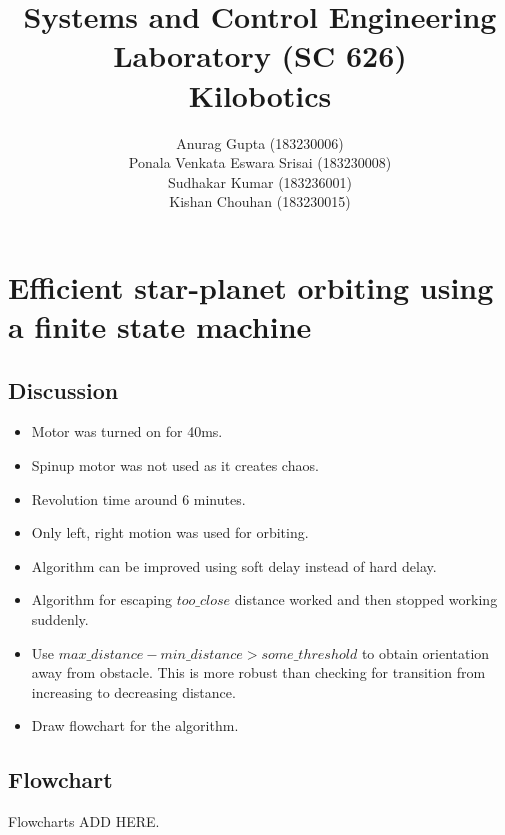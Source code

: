 \documentclass{report}[12pt]
\author{Anurag Gupta (183230006) \\ Ponala Venkata Eswara Srisai
(183230008)\\ Sudhakar Kumar (183236001)\\ Kishan Chouhan (183230015)}
\title{Systems and Control Engineering Laboratory (SC 626) \\ Kilobotics}
\begin{document}
\maketitle
\tableofcontents
\thispagestyle{empty}
\mbox{}
%

\chapter{Efficient star-planet orbiting using a finite state machine}
\section{Discussion}
\begin{itemize}
    \item Motor was turned on for 40ms.
    \item Spinup motor was not used as it creates chaos.
    \item Revolution time around 6 minutes.
    \item Only left, right motion was used for orbiting.
    \item Algorithm can be improved using soft delay instead of hard delay.
    \item Algorithm for escaping $too\_close$ distance worked and then stopped working suddenly.
    \item Use $max\_distance-min\_distance>some\_threshold$ to obtain orientation away from obstacle. This is more robust than checking for transition from increasing to decreasing distance.
    \item Draw flowchart for the algorithm.
\end{itemize}
\section{Flowchart}
Flowcharts ADD HERE.
\end{document}

